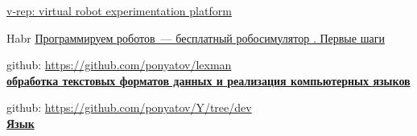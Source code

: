 \begin{thebibliography}{9}

 \href{http://www.coppeliarobotics.com/}{v-rep:
virtual robot experimentation platform}

 Habr \href{http://habrahabr.ru/company/makeitlab/blog/253357/}{Программируем роботов\ --- бесплатный робосимулятор \vrep. Первые шаги}

 github: \url{https://github.com/ponyatov/lexman}\\
\textbf{\href{https://github.com/ponyatov/lexman/raw/master/lexman.pdf}{обработка
текстовых форматов данных и реализация компьютерных языков}}

 github: \url{https://github.com/ponyatov/Y/tree/dev}\\
\textbf{\href{https://github.com/ponyatov/Y/raw/dev/doc/bI.pdf}{Язык \bi}}

\end{thebibliography}
